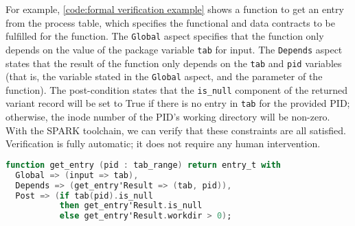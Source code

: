 For example, \autoref{code:formal verification example} shows a function to get an entry from the process table, which specifies the functional and data contracts to be fulfilled for the function.
The \lstinline[language=Ada]{Global} aspect specifies that the function only depends on the value of the package variable \lstinline[language=Ada]{tab} for input.
The \lstinline[language=Ada]{Depends} aspect states that the result of the function only depends on the \lstinline[language=Ada]{tab} and \lstinline[language=Ada]{pid} variables (that is, the variable stated in the \lstinline[language=Ada]{Global} aspect, and the parameter of the function).
The post-condition states that the \lstinline[language=Ada]{is_null} component of the returned variant record will be set to True if there is no entry in \lstinline[language=Ada]{tab} for the provided PID; otherwise, the inode number of the PID's working directory will be non-zero.
With the SPARK toolchain, we can verify that these constraints are all satisfied.
Verification is fully automatic; it does not require any human intervention.

\begin{lstlisting}[float=tb,caption={Functional and data contracts.}, label={code:formal verification example}, language=Ada]
function get_entry (pid : tab_range) return entry_t with
  Global => (input => tab),
  Depends => (get_entry'Result => (tab, pid)),
  Post => (if tab(pid).is_null
           then get_entry'Result.is_null
           else get_entry'Result.workdir > 0);
\end{lstlisting}
